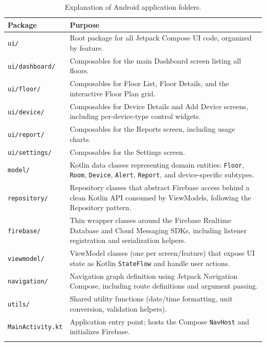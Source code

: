 \documentclass[11pt,a4paper]{article}
\begin{document}
\begin{longtable}{@{}p{3.4cm}p{10.6cm}@{}}
\toprule
\textbf{Package} & \textbf{Purpose} \\
\midrule
\endhead
\texttt{ui/} & Root package for all Jetpack Compose UI code, organized by feature. \\
\texttt{ui/dashboard/} & Composables for the main Dashboard screen listing all floors. \\
\texttt{ui/floor/} & Composables for Floor List, Floor Details, and the interactive Floor Plan grid. \\
\texttt{ui/device/} & Composables for Device Details and Add Device screens, including per-device-type control widgets. \\
\texttt{ui/report/} & Composables for the Reports screen, including usage charts. \\
\texttt{ui/settings/} & Composables for the Settings screen. \\
\texttt{model/} & Kotlin data classes representing domain entities: \texttt{Floor}, \texttt{Room}, \texttt{Device}, \texttt{Alert}, \texttt{Report}, and device-specific subtypes. \\
\texttt{repository/} & Repository classes that abstract Firebase access behind a clean Kotlin API consumed by ViewModels, following the Repository pattern. \\
\texttt{firebase/} & Thin wrapper classes around the Firebase Realtime Database and Cloud Messaging SDKs, including listener registration and serialization helpers. \\
\texttt{viewmodel/} & ViewModel classes (one per screen/feature) that expose UI state as Kotlin \texttt{StateFlow} and handle user actions. \\
\texttt{navigation/} & Navigation graph definition using Jetpack Navigation Compose, including route definitions and argument passing. \\
\texttt{utils/} & Shared utility functions (date/time formatting, unit conversion, validation helpers). \\
\texttt{MainActivity.kt} & Application entry point; hosts the Compose \texttt{NavHost} and initializes Firebase. \\
\bottomrule
\caption{Explanation of Android application folders.}
\label{tab:android-folders-explained}
\end{longtable}
\end{document}
